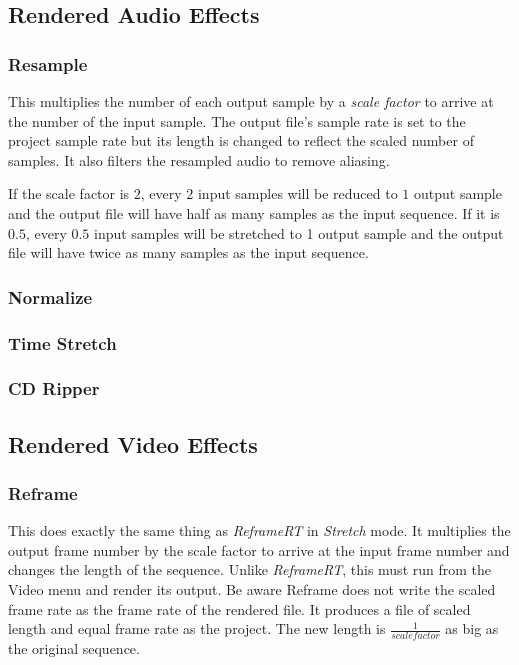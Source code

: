 \subsection{Rendered Audio Effects}%
\label{sub:renederd_audio_effets}

\subsubsection*{Resample}%
\label{ssub:resample}

This multiplies the number of each output sample by a \textit{scale factor} to arrive at the number of the input sample. The output file's sample rate is set to the project sample rate but its length is changed to reflect the scaled number of samples. It also filters the resampled audio to remove aliasing.

If the scale factor is $2$, every $2$ input samples will be reduced to $1$ output sample and the output file will have half as many samples as the input sequence. If it is $0.5$, every $0.5$ input samples will be stretched to 1 output sample and the output file will have twice as many samples as the input sequence.

\subsubsection*{Normalize}%
\label{ssub:normalize}

\subsubsection*{Time Stretch}%
\label{ssub:time_stretch}

\subsubsection*{CD Ripper}%
\label{ssub:cd_ripper}


\subsection{Rendered Video Effects}%
\label{sub:renederd_video_effets}

\subsubsection*{Reframe}%
\label{ssub:reframe}

This does exactly the same thing as \textit{ReframeRT} in \textit{Stretch} mode. It multiplies the output frame number by the scale factor to arrive at the input frame number and changes the length of the sequence. Unlike \textit{ReframeRT}, this must run from the Video menu and render its output. Be aware Reframe does not write the scaled frame rate as the frame rate of the rendered file. It produces a file of scaled length and equal frame rate as the project. The new length is $\frac{1}{scale factor}$ as big as the original sequence.

